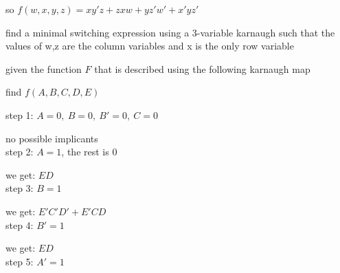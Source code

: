 \documentclass[a4paper,12pt]{article}
\begin{document}
\begin{question}
\begin{subquestion}
\begin{answer}
so \(f(w,x,y,z)=xy'z+zxw+yz'w'+x'yz'\)\\[0pt]
\end{answer}
\end{subquestion}
\begin{subquestion}
find a minimal switching expression using a 3-variable karnaugh such that the values of w,z are the column variables and x is the only row variable\\[0pt]
\end{subquestion}
\end{question}
\begin{question}
given the function \(F\) that is described using the following karnaugh map\\[0pt]

\begin{center}

\end{center}
\begin{subquestion}
find \(f(A,B,C,D,E)\)\\[0pt]
\begin{answer}
step 1: \(A=0,\ B=0,\ B'=0,\ C=0\)\\[0pt]

\begin{center}

\end{center}

no possible implicants\\[0pt]
step 2: \(A=1\), the rest is \(0\)\\[0pt]

\begin{center}

\end{center}

we get: \(ED\)\\[0pt]
step 3: \(B = 1\)\\[0pt]

\begin{center}

\end{center}

we get: \(E'C'D' + E'CD\)\\[0pt]
step 4: \(B' = 1\)\\[0pt]

\begin{center}

\end{center}

we get: \(ED\)\\[0pt]
step 5: \(A' = 1\)\\[0pt]


\end{answer}
\end{subquestion}
\end{question}
\end{document}
